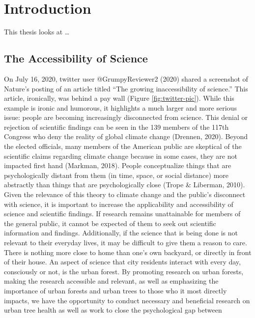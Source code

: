 \documentclass[12pt,twoside]{reedthesis}
\begin{document}
\hypertarget{intro}{%
\chapter{Introduction}\label{intro}}

This thesis looks at \ldots{}

\hypertarget{the-accessibility-of-science}{%
\section{The Accessibility of Science}\label{the-accessibility-of-science}}

On July 16, 2020, twitter user @GrumpyReviewer2 (2020) shared a
screenshot of Nature's posting of an article titled ``The growing
inaccessibility of science.'' This article, ironically, was behind a pay
wall (Figure \ref{fig:twitter-pic}). While this example is ironic and
humorous, it highlights a much larger and more serious issue: people are
becoming increasingly disconnected from science. This denial or
rejection of scientific findings can be seen in the 139 members of the
117th Congress who deny the reality of global climate change (Drennen, 2020).
Beyond the elected officials, many members of the American public are
skeptical of the scientific claims regarding climate change because in
some cases, they are not impacted first hand (Markman, 2018). People
conceptualize things that are psychologically distant from them (in
time, space, or social distance) more abstractly than things that are
psychologically close (Trope \& Liberman, 2010). Given the relevance of this theory
to climate change and the public's disconnect with science, it is
important to increase the applicability and accessibility of science and
scientific findings. If research remains unattainable for members of the
general public, it cannot be expected of them to seek out scientific
information and findings. Additionally, if the science that is being
done is not relevant to their everyday lives, it may be difficult to
give them a reason to care. There is nothing more close to home than
one's own backyard, or directly in front of their house. An aspect of
science that city residents interact with every day, consciously or not,
is the urban forest. By promoting research on urban forests, making the
research accessible and relevant, as well as emphasizing the importance
of urban forests and urban trees to those who it most directly impacts,
we have the opportunity to conduct necessary and beneficial research on
urban tree health as well as work to close the psychological gap between
\end{document}
